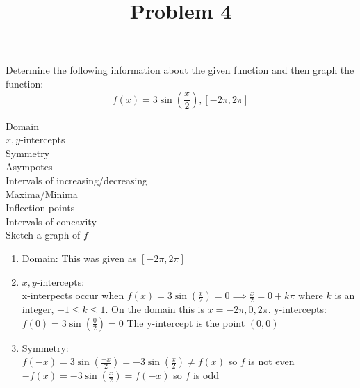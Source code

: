 \documentclass{ximera}
\title[Problem 4]{Problem 4}
\begin{document}
\begin{abstract} \end{abstract}
\maketitle


\begin{problem}
  Determine the following information about the given function and then graph the function:
  \[
    f(x) = 3\sin\left(\frac{x}{2}\right), [-2\pi,2\pi]
  \]

 Domain\\
  $x,y$-intercepts\\
  Symmetry\\
  Asympotes\\
  Intervals of increasing/decreasing\\
  Maxima/Minima\\
  Inflection points\\
    Intervals of concavity\\
    Sketch a graph of $f$

\begin{explanation}
\begin{enumerate}

\item Domain: This was given as $[-2\pi,2\pi]$

\item $x,y$-intercepts:\\
x-interpects occur when $f(x) = 3\sin\left(\frac{x}{2}\right)=0 \implies \frac{x}{2}=0+k\pi$ where $k$ is an integer, $-1\le k \le 1$.  On the domain this is $x=-2\pi,0,2\pi$.
y-intercepts: $f(0) = 3\sin\left(\frac{0}{2}\right)=0$  The y-intercept is the point $(0,0)$

\item Symmetry:\\
$f(-x)=3\sin\left(\frac{-x}{2}\right)=-3\sin\left(\frac{x}{2}\right) \ne f(x)$ so $f$ is not even
$-f(x)=-3\sin\left(\frac{x}{2}\right)=f(-x)$ so $f$ is odd


\end{enumerate}
\end{explanation}
\end{problem}
\end{document}
